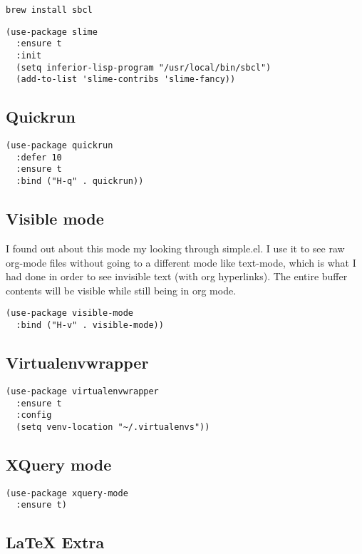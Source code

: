 \documentclass[11pt]{article}
\begin{document}
\begin{verbatim}
brew install sbcl
\end{verbatim}

\begin{verbatim}
(use-package slime
  :ensure t
  :init
  (setq inferior-lisp-program "/usr/local/bin/sbcl")
  (add-to-list 'slime-contribs 'slime-fancy))
\end{verbatim}

\subsection{Quickrun}
\label{sec-18-43}

\begin{verbatim}
(use-package quickrun
  :defer 10
  :ensure t
  :bind ("H-q" . quickrun))
\end{verbatim}

\subsection{Visible mode}
\label{sec-18-44}

I found out about this mode my looking through simple.el. I use it to
see raw org-mode files without going to a different mode like
text-mode, which is what I had done in order to see invisible text
(with org hyperlinks). The entire buffer contents will be visible
while still being in org mode.

\begin{verbatim}
(use-package visible-mode
  :bind ("H-v" . visible-mode))
\end{verbatim}

\subsection{Virtualenvwrapper}
\label{sec-18-45}

\begin{verbatim}
(use-package virtualenvwrapper
  :ensure t
  :config
  (setq venv-location "~/.virtualenvs"))
\end{verbatim}
\subsection{XQuery mode}
\label{sec-18-46}

\begin{verbatim}
(use-package xquery-mode
  :ensure t)
\end{verbatim}
\subsection{\LaTeX{} Extra}
\label{sec-18-47}
\end{document}

